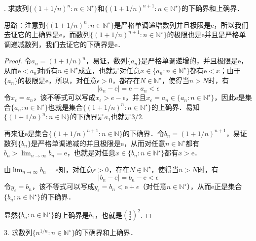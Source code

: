 . 求数列$\{ (1+1/n)^n : n \in \mathbb{N}^\star \}$和$\{(1+1/n)^{n+1}:n\in\mathbb{N}^\star\}$的下确界和上确界．

思路：注意到$\{ (1+1/n)^n : n \in \mathbb{N}^\star \}$是严格单调递增数列并且极限是$\mathrm{e}$，所以我们去证它的上确界是$\mathrm{e}$，而数列$\{(1+1/n)^{n+1}:n\in\mathbb{N}^\star\}$的极限也是$\mathrm{e}$并且是严格单调递减数列，我们去证它的下确界是$\mathrm{e}$．
\begin{proof}
令$a_n = (1+1/n)^n$，易证，数列$\{ a_n \}$是严格单调递增的，并且极限是$\mathrm{e}$，从而$\mathrm{e} < a_n$对所有$n \in \mathbb{N}^\star$成立，也就是对任意$x \in \{a_n:n\in\mathbb{N}^\star\}$都有$\mathrm{e}<x$；由于$\{a_n\}$的极限是$\mathrm{e}$，所以，对任意$\epsilon >0$，都存在$N \in \mathbb{N}^\star$，使得当$n>N$时，有
\begin{equation}
    |a_n - \mathrm{e}| = \mathrm{e}-a_n < \epsilon
\end{equation}
令$x_\epsilon = a_n$，该不等式可以写成$x_\epsilon > e - \epsilon$，并且$x_\epsilon = a_n \in \{a_n : n \in \mathbb{N}^\star \}$，因此$\mathrm{e}$是集合$\{ a_n : n \in \mathbb{N}^\star \}$也就是集合$\{ (1+1/n)^n : n \in \mathbb{N}^\star \}$的上确界．易知$\{(1+1/n)^n:n\in\mathbb{N}\}$的下确界是$a_1$也就是$3/2$.

再来证$\mathrm{e}$是集合$\{(1+1/n)^{n+1}:n\in\mathbb{N}\}$的下确界．令$b_n=(1+1/n)^{n+1}$，易证数列$\{b_n\}$是严格单调递减的并且极限是$\mathrm{e}$，从而对任意$n \in \mathbb{N}^\star$都有$b_n > \displaystyle\lim_{n\to\infty} b_n = \mathrm{e}$，也就是对任意$ x \in \{ b_n : n \in \mathbb{N}^\star \}$都有$x > \mathrm{e}$．

由$\displaystyle\lim_{n\to\infty}b_n = e$知，对任意$\epsilon > 0$，存在$N \in \mathbb{N}^\star$，使得当$n > N$时，有
\begin{equation}
    |b_n - \mathrm{e}| = b_n - \mathrm{e} < \epsilon 
\end{equation}
令$y_\epsilon = b_n$，该不等式可以写成$y_\epsilon = b_n < \mathrm{e} + \epsilon$（对任意$n\in\mathbb{N}^\star$），从而$\mathrm{e}$正是集合$\{b_n:n\in\mathbb{N}^\star\}$的下确界．

显然$\{b_n:n\in\mathbb{N}^\star\}$的上确界是$b_1$，也就是$\displaystyle \left(\frac{3}{2}\right)^2$.
\end{proof}

3. 求数列$\{n^{1/n}:n\in\mathbb{N}^\star\}$的下确界和上确界．

